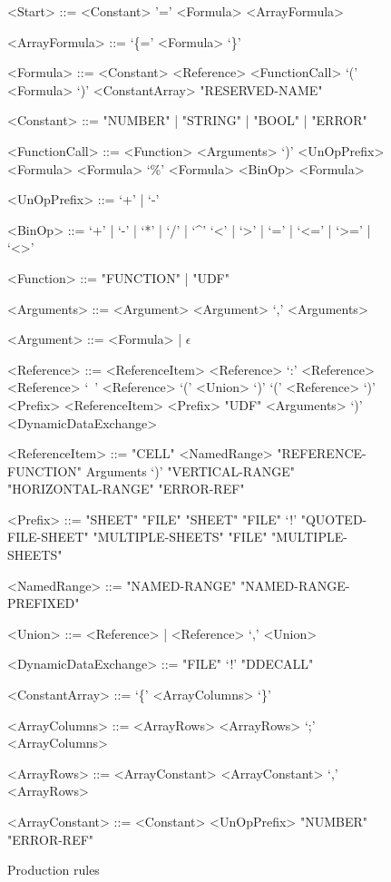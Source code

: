 \documentclass[conference]{IEEEtran}
\begin{document}
\begin{figure}
\caption{Production rules}
\label{figure:productions}
\centering
\begin{grammar}
<Start> ::= <Constant>
	\alt '=' <Formula>
	\alt <ArrayFormula>
	
<ArrayFormula> ::= `\{=' <Formula> `\}'

<Formula> ::= <Constant>
         \alt <Reference>
         \alt <FunctionCall>
         \alt `(' <Formula> `)'
         \alt <ConstantArray>
         \alt "RESERVED-NAME"
         
<Constant> ::= "NUMBER" | "STRING" | "BOOL" | "ERROR"
         
<FunctionCall> ::= <Function> <Arguments> `)'
		\alt <UnOpPrefix> <Formula>
		\alt <Formula> `\%'
		\alt <Formula> <BinOp> <Formula>
		
<UnOpPrefix> ::= `+' | `-'

<BinOp> ::= `+' | `-' | `*' | `/' | `\textasciicircum'
	\alt `<' | `>' | `=' | `<=' | `>=' | `<>'

<Function> ::= "FUNCTION" | "UDF"
	
<Arguments> ::= <Argument>
	\alt <Argument> `,' <Arguments>

<Argument> ::= <Formula> | $\epsilon$

<Reference> ::= <ReferenceItem>
	\alt <Reference> `:' <Reference>
	\alt <Reference> `\ ' <Reference>
	\alt `(' <Union> `)'
	\alt `(' <Reference> `)' 
	\alt <Prefix> <ReferenceItem>
    \alt <Prefix> "UDF" <Arguments> `)'
    \alt <DynamicDataExchange>
    
<ReferenceItem> ::= "CELL"
	\alt <NamedRange>
	\alt "REFERENCE-FUNCTION" Arguments `)'
	\alt "VERTICAL-RANGE"
	\alt "HORIZONTAL-RANGE"
	\alt "ERROR-REF"
	
<Prefix> ::= "SHEET"
	\alt "FILE" "SHEET"
	\alt "FILE" `!'
	\alt "QUOTED-FILE-SHEET"
	\alt "MULTIPLE-SHEETS"
	\alt "FILE" "MULTIPLE-SHEETS"
	
<NamedRange> ::= "NAMED-RANGE"
            \alt "NAMED-RANGE-PREFIXED"

<Union> ::= <Reference> | <Reference> `,' <Union>
	
<DynamicDataExchange> ::= "FILE" `!' "DDECALL"

<ConstantArray> ::= `\{' <ArrayColumns> `\}'

<ArrayColumns> ::= <ArrayRows>
	\alt <ArrayRows> `;' <ArrayColumns>

<ArrayRows> ::= <ArrayConstant>
	\alt <ArrayConstant> `,' <ArrayRows>
	
<ArrayConstant> ::= <Constant>
	\alt <UnOpPrefix> "NUMBER"
	\alt "ERROR-REF"

\end{grammar}
\end{figure}
\end{document}
